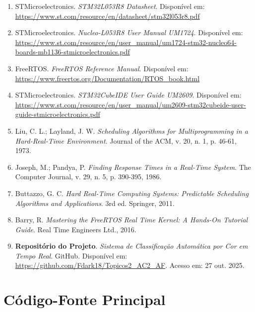\documentclass[12pt,a4paper]{article}
\begin{document}
\begin{enumerate}
    \item STMicroelectronics. \textit{STM32L053R8 Datasheet}. Disponível em: \url{https://www.st.com/resource/en/datasheet/stm32l053r8.pdf}

    \item STMicroelectronics. \textit{Nucleo-L053R8 User Manual UM1724}. Disponível em: \url{https://www.st.com/resource/en/user_manual/um1724-stm32-nucleo64-boards-mb1136-stmicroelectronics.pdf}

    \item FreeRTOS. \textit{FreeRTOS Reference Manual}. Disponível em: \url{https://www.freertos.org/Documentation/RTOS_book.html}

    \item STMicroelectronics. \textit{STM32CubeIDE User Guide UM2609}. Disponível em: \url{https://www.st.com/resource/en/user_manual/um2609-stm32cubeide-user-guide-stmicroelectronics.pdf}

    \item Liu, C. L.; Layland, J. W. \textit{Scheduling Algorithms for Multiprogramming in a Hard-Real-Time Environment}. Journal of the ACM, v. 20, n. 1, p. 46-61, 1973.

    \item Joseph, M.; Pandya, P. \textit{Finding Response Times in a Real-Time System}. The Computer Journal, v. 29, n. 5, p. 390-395, 1986.

    \item Buttazzo, G. C. \textit{Hard Real-Time Computing Systems: Predictable Scheduling Algorithms and Applications}. 3rd ed. Springer, 2011.

    \item Barry, R. \textit{Mastering the FreeRTOS Real Time Kernel: A Hands-On Tutorial Guide}. Real Time Engineers Ltd., 2016.

    \item \textbf{Repositório do Projeto}. \textit{Sistema de Classificação Automática por Cor em Tempo Real}. GitHub. Disponível em: \url{https://github.com/Fdark18/Topicos2_AC2_AF}. Acesso em: 27 out. 2025.
\end{enumerate}

\appendix

\section{Código-Fonte Principal}
\end{document}
